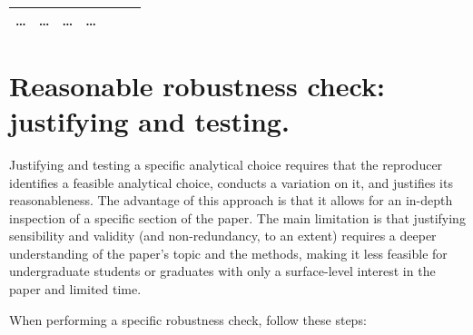 \documentclass[]{book}
\begin{document}
\begin{longtable}[]{@{}lllllll@{}}
\begin{minipage}[t]{0.12\columnwidth}
\ldots{}\strut
\end{minipage} & \begin{minipage}[t]{0.19\columnwidth}\raggedright
\ldots{}\strut
\end{minipage} & \begin{minipage}[t]{0.18\columnwidth}\raggedright
\ldots{}\strut
\end{minipage} & \begin{minipage}[t]{0.12\columnwidth}\raggedright
\ldots{}\strut
\end{minipage}\tabularnewline
\bottomrule
\end{longtable}

\hypertarget{reasonable-robustness-check-justifying-and-testing.}{%
\section{Reasonable robustness check: justifying and testing.}\label{reasonable-robustness-check-justifying-and-testing.}}

Justifying and testing a specific analytical choice requires that the reproducer identifies a feasible analytical choice, conducts a variation on it, and justifies its reasonableness. The advantage of this approach is that it allows for an in-depth inspection of a specific section of the paper. The main limitation is that justifying sensibility and validity (and non-redundancy, to an extent) requires a deeper understanding of the paper's topic and the methods, making it less feasible for undergraduate students or graduates with only a surface-level interest in the paper and limited time.

When performing a specific robustness check, follow these steps:
\end{document}
